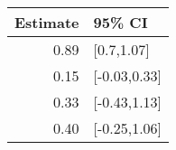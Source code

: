 \begin{tabular}{rl}
  \hline
Estimate & 95\% CI \\ 
  \hline
0.89 & [0.7,1.07] \\ 
  0.15 & [-0.03,0.33] \\ 
  0.33 & [-0.43,1.13] \\ 
  0.40 & [-0.25,1.06] \\ 
   \hline
\end{tabular}

